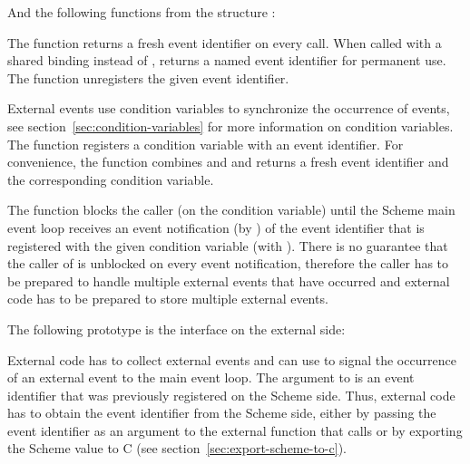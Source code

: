 \begin{protos}
\end{protos}

\noindent{}And the following functions from the structure
:

\begin{protos}
\end{protos}

\noindent{}The function  returns a fresh
event identifier on every call.  When called with a shared binding
instead of ,  returns a named
event identifier for permanent use.  The function
 unregisters the given event
identifier.

External events use condition variables to synchronize the occurrence
of events, see section~\ref{sec:condition-variables} for more
information on condition variables.  The function
 registers a condition
variable with an event identifier.  For convenience, the function
 combines  and
 and returns a fresh event
identifier and the corresponding condition variable.

The function  blocks the caller (on the
condition variable) until the Scheme main event loop receives an event
notification (by ) of the event
identifier that is registered with the given condition variable (with
).  There is no guarantee
that the caller of  is unblocked on
every event notification, therefore the caller has to be prepared to
handle multiple external events that have occurred and external code
has to be prepared to store multiple external events.

The following prototype is the interface on the external side:

\begin{protos}
\end{protos}

\noindent{}External code has to collect external events and can use
 to signal the occurrence of an
external event to the main event loop.  The argument to
 is an event identifier that was
previously registered on the Scheme side.  Thus, external code has to
obtain the event identifier from the Scheme side, either by passing
the event identifier as an argument to the external function that
calls  or by exporting the Scheme
value to C (see section~\ref{sec:export-scheme-to-c}).


